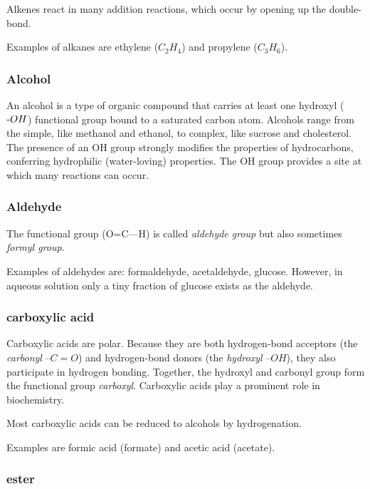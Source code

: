 \documentclass{article}
\def\mhyphen{{\hbox{-}}}
\begin{document}
Alkenes react in many addition reactions, which occur by opening up the double-bond.

Examples of alkanes are ethylene ($C_2H_4$) and propylene ($C_3H_6$).

\subsubsection{Alcohol}

An alcohol is a type of organic compound that carries at least one hydroxyl
(${\mhyphen}OH$) functional group bound to a saturated carbon atom. Alcohols range from the
simple, like methanol and ethanol, to complex, like sucrose and cholesterol. The presence
of an OH group strongly modifies the properties of hydrocarbons, conferring hydrophilic
(water-loving) properties. The OH group provides a site at which many reactions can occur.

\subsubsection{Aldehyde}


The functional group (O=C---H) is called {\em aldehyde group\/} but also sometimes {\em
formyl group}.

Examples of aldehydes are: formaldehyde, acetaldehyde, glucose. However, in aqueous
solution only a tiny fraction of glucose exists as the aldehyde.

\subsubsection{carboxylic acid}

Carboxylic acids are polar. Because they are both hydrogen-bond acceptors (the {\em
carbonyl\/} $–C=O$) and hydrogen-bond donors (the {\em hydroxyl\/} $–OH$), they also
participate in hydrogen bonding. Together, the hydroxyl and carbonyl group form the
functional group {\em carboxyl}.
Carboxylic acids play a prominent role in biochemistry.

Most carboxylic acids can be reduced to alcohols by hydrogenation.

Examples are formic acid (formate) and acetic acid (acetate).

\subsubsection{ester}
\end{document}
